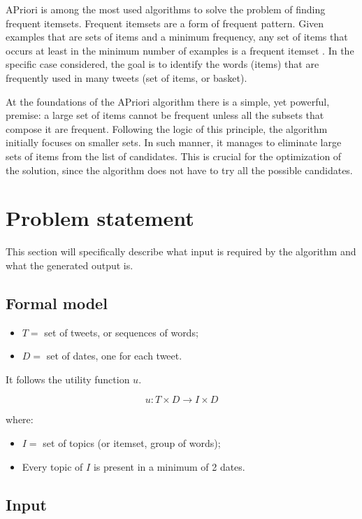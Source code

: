 APriori is among the most used algorithms to solve the problem of finding frequent itemsets. Frequent itemsets are a form of frequent pattern. Given examples that are sets of items and a minimum frequency, any set of items that occurs at least in the minimum number of examples is a frequent itemset \cite{Toivonen2010}. In the specific case considered, the goal is to identify the words (items) that are frequently used in many tweets (set of items, or basket).

At the foundations of the APriori algorithm there is a simple, yet powerful, premise: a large set of items cannot be frequent unless all the subsets that compose it are frequent. Following the logic of this principle, the algorithm initially focuses on smaller sets. In such manner, it manages to eliminate large sets of items from the list of candidates. This is crucial for the optimization of the solution, since the algorithm does not have to try all the possible candidates.


\section{Problem statement}\label{sect_probl_stat}

This section will specifically describe what input is required by the algorithm and what the generated output is.

\subsection*{Formal model}

\begin{itemize}
  \item $T =$ set of tweets, or sequences of words;
  \item $D =$ set of dates, one for each tweet.
\end{itemize}

It follows the utility function $u$.

$$ u: T \times D \rightarrow I \times D $$

where:
\begin{itemize}
  \item $I =$ set of topics (or itemset, group of words);
  \item Every topic of $I$ is present in a minimum of 2 dates.
\end{itemize}

\subsection*{Input}

